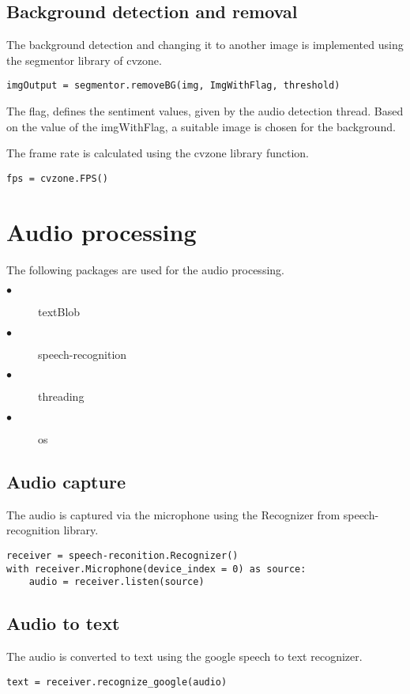 \subsection{Background detection and removal}
The background detection and changing it to another image is implemented using the segmentor library of cvzone.
\begin{lstlisting}[breaklines]
imgOutput = segmentor.removeBG(img, ImgWithFlag, threshold)
\end{lstlisting}
The flag, defines the sentiment values, given by the audio detection thread. Based on the value of the imgWithFlag, a suitable image is chosen for the background.

The frame rate is calculated using the cvzone library function.
\begin{lstlisting}[breaklines]
fps = cvzone.FPS()
\end{lstlisting}



\section{Audio processing}
The following packages are used for the audio processing.
\begin{description}
\item[$\bullet$] textBlob
\item[$\bullet$] speech-recognition
\item[$\bullet$] threading
\item[$\bullet$] os
\end{description}
\subsection{Audio capture}
The audio is captured via the microphone using the Recognizer from speech-recognition library.
\begin{lstlisting}[breaklines]
receiver = speech-reconition.Recognizer()
with receiver.Microphone(device_index = 0) as source:
	audio = receiver.listen(source)
\end{lstlisting}

\subsection{Audio to text}
The audio is converted to text using the google speech to text recognizer.
\begin{lstlisting}[breaklines]
text = receiver.recognize_google(audio)
\end{lstlisting}

